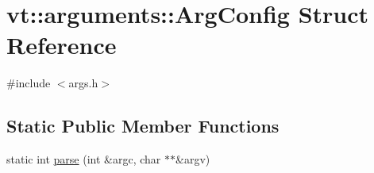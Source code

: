 \hypertarget{structvt_1_1arguments_1_1_arg_config}{}\section{vt\+:\+:arguments\+:\+:Arg\+Config Struct Reference}
\label{structvt_1_1arguments_1_1_arg_config}


{\ttfamily \#include $<$args.\+h$>$}

\subsection*{Static Public Member Functions}
\begin{DoxyCompactItemize}
\item 
static int \hyperlink{structvt_1_1arguments_1_1_arg_config_ae47fd5ec6ec8607e0adbe4655b840062}{parse} (int \&argc, char $\ast$$\ast$\&argv)
\end{DoxyCompactItemize}
